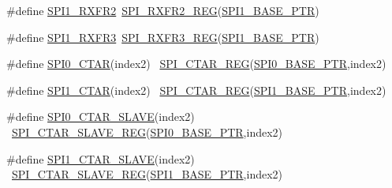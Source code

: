 \begin{DoxyCompactItemize}
\item 
\#define \hyperlink{group___s_p_i___register___accessor___macros_ga7500219736325d1dd7402e0a0fcafbb2}{S\+P\+I1\+\_\+\+R\+X\+F\+R2}~\hyperlink{group___s_p_i___register___accessor___macros_ga23c02a896d81445dbdea2e8d0d490b0a}{S\+P\+I\+\_\+\+R\+X\+F\+R2\+\_\+\+R\+EG}(\hyperlink{group___s_p_i___peripheral_gae28fd789e0602a32076c1c13ca39f5af}{S\+P\+I1\+\_\+\+B\+A\+S\+E\+\_\+\+P\+TR})
\item 
\#define \hyperlink{group___s_p_i___register___accessor___macros_gaa7109ab9c0c71f5032aa3b387da1d0dc}{S\+P\+I1\+\_\+\+R\+X\+F\+R3}~\hyperlink{group___s_p_i___register___accessor___macros_ga2419cd7143d831f0a31ac7bda0da7af7}{S\+P\+I\+\_\+\+R\+X\+F\+R3\+\_\+\+R\+EG}(\hyperlink{group___s_p_i___peripheral_gae28fd789e0602a32076c1c13ca39f5af}{S\+P\+I1\+\_\+\+B\+A\+S\+E\+\_\+\+P\+TR})
\item 
\#define \hyperlink{group___s_p_i___register___accessor___macros_ga6284043913bd4cb314a1c3fa38930e30}{S\+P\+I0\+\_\+\+C\+T\+AR}(index2)                                            ~\hyperlink{group___s_p_i___register___accessor___macros_ga5ab762c9000b796d14c1ce822eefc436}{S\+P\+I\+\_\+\+C\+T\+A\+R\+\_\+\+R\+EG}(\hyperlink{group___s_p_i___peripheral_ga851f64a97b5919c1f99a34db5918b3b4}{S\+P\+I0\+\_\+\+B\+A\+S\+E\+\_\+\+P\+TR},index2)
\item 
\#define \hyperlink{group___s_p_i___register___accessor___macros_gacdd90c4720727e70d545f64fb6061adf}{S\+P\+I1\+\_\+\+C\+T\+AR}(index2)                                            ~\hyperlink{group___s_p_i___register___accessor___macros_ga5ab762c9000b796d14c1ce822eefc436}{S\+P\+I\+\_\+\+C\+T\+A\+R\+\_\+\+R\+EG}(\hyperlink{group___s_p_i___peripheral_gae28fd789e0602a32076c1c13ca39f5af}{S\+P\+I1\+\_\+\+B\+A\+S\+E\+\_\+\+P\+TR},index2)
\item 
\#define \hyperlink{group___s_p_i___register___accessor___macros_ga798105887218627609d0e8a5800f3ca9}{S\+P\+I0\+\_\+\+C\+T\+A\+R\+\_\+\+S\+L\+A\+VE}(index2)                                ~\hyperlink{group___s_p_i___register___accessor___macros_ga2025336cecfcf0c5b7cdb30e8056505b}{S\+P\+I\+\_\+\+C\+T\+A\+R\+\_\+\+S\+L\+A\+V\+E\+\_\+\+R\+EG}(\hyperlink{group___s_p_i___peripheral_ga851f64a97b5919c1f99a34db5918b3b4}{S\+P\+I0\+\_\+\+B\+A\+S\+E\+\_\+\+P\+TR},index2)
\item 
\#define \hyperlink{group___s_p_i___register___accessor___macros_ga94ba9eab472c3efa6152378d6c2c8275}{S\+P\+I1\+\_\+\+C\+T\+A\+R\+\_\+\+S\+L\+A\+VE}(index2)                                ~\hyperlink{group___s_p_i___register___accessor___macros_ga2025336cecfcf0c5b7cdb30e8056505b}{S\+P\+I\+\_\+\+C\+T\+A\+R\+\_\+\+S\+L\+A\+V\+E\+\_\+\+R\+EG}(\hyperlink{group___s_p_i___peripheral_gae28fd789e0602a32076c1c13ca39f5af}{S\+P\+I1\+\_\+\+B\+A\+S\+E\+\_\+\+P\+TR},index2)

\end{DoxyCompactItemize}
